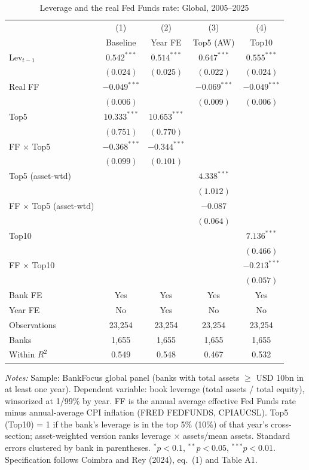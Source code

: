 \documentclass[11pt]{article}
\begin{document}
\clearpage

\begin{table}[htbp]
\centering
\small
\begin{threeparttable}
\caption{Leverage and the real Fed Funds rate: Global, 2005--2025}
\label{tab:cr_eq1_3}
\begin{tabular}{lcccc}
\toprule
 & (1) & (2) & (3) & (4) \\
 & Baseline & Year FE & Top5 (AW) & Top10 \\
\midrule
Lev$_{t-1}$ & $0.542^{***}$ & $0.514^{***}$ & $0.647^{***}$ & $0.555^{***}$ \\
 & $(0.024)$ & $(0.025)$ & $(0.022)$ & $(0.024)$ \\[2pt]
Real FF & $-0.049^{***}$ &  & $-0.069^{***}$ & $-0.049^{***}$ \\
 & $(0.006)$ &  & $(0.009)$ & $(0.006)$ \\[2pt]
Top5 & $10.333^{***}$ & $10.653^{***}$ &  &  \\
 & $(0.751)$ & $(0.770)$ &  &  \\[2pt]
FF $\times$ Top5 & $-0.368^{***}$ & $-0.344^{***}$ &  &  \\
 & $(0.099)$ & $(0.101)$ &  &  \\[2pt]
Top5 (asset-wtd) &  &  & $4.338^{***}$ &  \\
 &  &  & $(1.012)$ &  \\[2pt]
FF $\times$ Top5 (asset-wtd) &  &  & $-0.087$ &  \\
 &  &  & $(0.064)$ &  \\[2pt]
Top10 &  &  &  & $7.136^{***}$ \\
 &  &  &  & $(0.466)$ \\[2pt]
FF $\times$ Top10 &  &  &  & $-0.213^{***}$ \\
 &  &  &  & $(0.057)$ \\
\midrule
Bank FE & Yes & Yes & Yes & Yes \\
Year FE & No & Yes & No & No \\
Observations & 23,254 & 23,254 & 23,254 & 23,254 \\
Banks & 1,655 & 1,655 & 1,655 & 1,655 \\
Within $R^2$ & 0.549 & 0.548 & 0.467 & 0.532 \\
\bottomrule
\end{tabular}
\begin{tablenotes}[flushleft]
\footnotesize
\item \textit{Notes:} Sample: BankFocus global panel (banks with total assets $\geq$ USD 10bn in at least one year). Dependent variable: book leverage (total assets / total equity), winsorized at 1/99\% by year. FF is the annual average effective Fed Funds rate minus annual-average CPI inflation (FRED FEDFUNDS, CPIAUCSL). Top5 (Top10) = 1 if the bank's leverage is in the top 5\% (10\%) of that year's cross-section; asset-weighted version ranks leverage $\times$ assets/mean assets. Standard errors clustered by bank in parentheses. $^{*}p<0.1$, $^{**}p<0.05$, $^{***}p<0.01$. Specification follows Coimbra and Rey (2024), eq.~(1) and Table A1.
\end{tablenotes}
\end{threeparttable}
\end{table}
\end{document}
